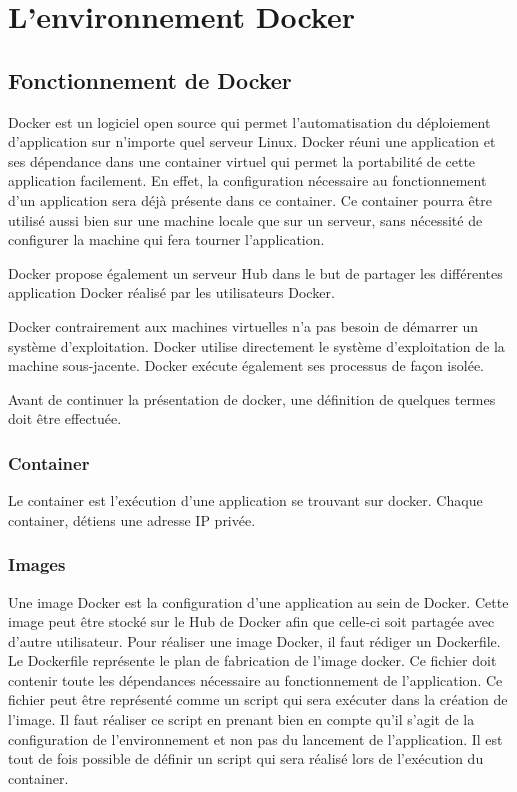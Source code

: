 \section{L'environnement Docker}

\subsection{Fonctionnement de Docker}

Docker est un logiciel open source qui permet l'automatisation du déploiement d'application sur n'importe quel serveur Linux. Docker réuni une application et ses dépendance dans une container virtuel qui permet la portabilité de cette application facilement. En effet, la configuration nécessaire au fonctionnement d'un application sera déjà présente dans ce container. Ce container pourra être utilisé aussi bien sur une machine locale que sur un serveur, sans nécessité de configurer la machine qui fera tourner l'application. 

Docker propose également un serveur Hub dans le but de partager les différentes application Docker réalisé par les utilisateurs Docker.

Docker contrairement aux machines virtuelles n'a pas besoin de démarrer un système d'exploitation. Docker utilise directement le système d'exploitation de la machine sous-jacente. Docker exécute également ses processus de façon isolée.

Avant de continuer la présentation de docker, une définition de quelques termes doit être effectuée. 



\subsubsection{Container}

Le container est l’exécution d'une application se trouvant sur docker. Chaque container, détiens une adresse IP privée.


\subsubsection{Images}

Une image Docker est la configuration d'une application au sein de Docker. Cette image peut être stocké sur le Hub de Docker afin que celle-ci soit partagée avec d'autre utilisateur. Pour réaliser une image Docker, il faut rédiger un Dockerfile. Le Dockerfile représente le plan de fabrication de l'image docker. Ce fichier doit contenir toute les dépendances nécessaire au fonctionnement de l'application. Ce fichier peut être représenté comme un script qui sera exécuter dans la création de l'image. Il faut réaliser ce script en prenant bien en compte qu'il s'agit de la configuration de l'environnement et non pas du lancement de l'application. Il est tout de fois possible de définir un script qui sera réalisé lors de l'exécution du container.

